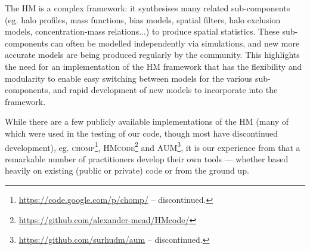 \documentclass[5p]{elsarticle}
\newcommand{\bd}[1]{\textcolor{purple}{\textbf{[BD: #1]}}}
\begin{document}
The HM is a complex framework: it synthesises many related sub-components (eg. halo profiles, mass functions, bias models, spatial filters, halo exclusion models, concentration-mass relations...) to produce spatial statistics. 
These sub-components can often be modelled independently via simulations, and new more accurate models are being produced regularly by the community. 
This highlights the need for an implementation of the HM framework that has the flexibility and modularity to enable easy switching between models for the various sub-components, and rapid development of new models to incorporate into the framework.


While there are a few publicly available implementations of the HM (many of which  were used in the testing of our code, though most have discontinued development),
eg. \textsc{chomp}\footnote{\url{https://code.google.com/p/chomp/}  -- discontinued.}, \textsc{HMcode}\footnote{\url{https://github.com/alexander-mead/HMcode/}} and \textsc{AUM}\footnote{\url{https://github.com/surhudm/aum} -- discontinued.},
it is our experience from that a remarkable number of 
practitioners develop their own tools --- whether based heavily on existing (public or private) code or from the ground up. 
\end{document}
